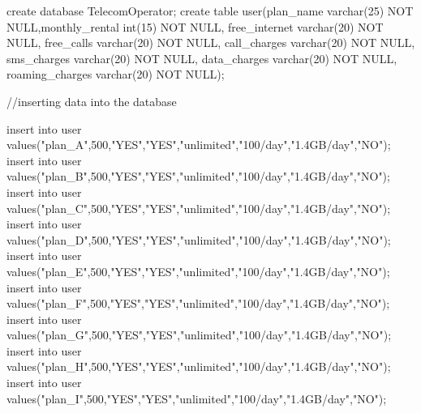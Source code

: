 create database TelecomOperator;
create table user(plan_name varchar(25) NOT NULL,monthly_rental int(15) NOT NULL, free_internet varchar(20) NOT NULL, free_calls varchar(20) NOT NULL, call_charges varchar(20) NOT NULL, sms_charges varchar(20) NOT NULL, data_charges varchar(20) NOT NULL, roaming_charges varchar(20) NOT NULL);


//inserting data into the database

insert into user values("plan_A",500,"YES","YES","unlimited","100/day","1.4GB/day","NO");
insert into user values("plan_B",500,"YES","YES","unlimited","100/day","1.4GB/day","NO");
insert into user values("plan_C",500,"YES","YES","unlimited","100/day","1.4GB/day","NO");
insert into user values("plan_D",500,"YES","YES","unlimited","100/day","1.4GB/day","NO");
insert into user values("plan_E",500,"YES","YES","unlimited","100/day","1.4GB/day","NO");
insert into user values("plan_F",500,"YES","YES","unlimited","100/day","1.4GB/day","NO");
insert into user values("plan_G",500,"YES","YES","unlimited","100/day","1.4GB/day","NO");
insert into user values("plan_H",500,"YES","YES","unlimited","100/day","1.4GB/day","NO");
insert into user values("plan_I",500,"YES","YES","unlimited","100/day","1.4GB/day","NO");